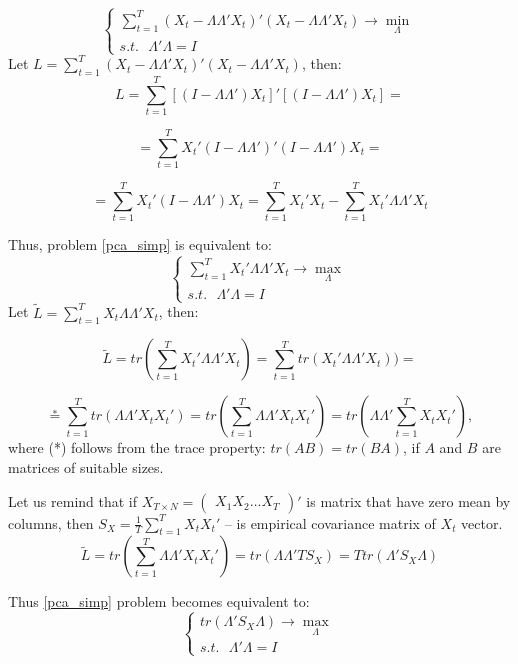 \documentclass[a4paper, 14pt]{article}
\begin{document}
\begin{equation} \label{pca_simp}
\begin{cases}
\sum_{t=1}^{T} (X_t - \Lambda \Lambda'X_t)'(X_t - \Lambda \Lambda'X_t) \rightarrow \min_{\Lambda} \\
s.t. \text{ } \Lambda'\Lambda = I
\end{cases}
\end{equation}
Let $L = \sum_{t=1}^{T} (X_t - \Lambda \Lambda'X_t)'(X_t - \Lambda \Lambda'X_t)$, then:
\[ L=\sum_{t=1}^{T} \left[(I - \Lambda \Lambda') X_t \right] ' \left[(I- \Lambda \Lambda') X_t \right] = 
\]

\[ =\sum_{t=1}^{T} X_t'(I - \Lambda \Lambda')'(I - \Lambda \Lambda') X_t = 
\]

\[
 =\sum_{t=1}^{T} X_t'(I - \Lambda \Lambda') X_t = \sum_{t=1}^{T} X_t' X_t - \sum_{t=1}^{T} X_t' \Lambda \Lambda' X_t	
\]

\noindent Thus, problem \eqref{pca_simp} is equivalent to: 
\begin{equation}
	\begin{cases}
	\sum_{t=1}^{T} X_t' \Lambda \Lambda' X_t \rightarrow \max_{\Lambda} \\
	s.t. \text{ } \Lambda'\Lambda = I
	\end{cases}
\end{equation}
Let $\tilde{L} = \sum_{t=1}^{T} X_t \Lambda \Lambda' X_t$, then:

\[\tilde{L} = tr(\sum_{t=1}^{T} X_t' \Lambda \Lambda' X_t) =  \sum_{t=1}^{T} tr( X_t' \Lambda \Lambda' X_t) ) = \]
 
\[\stackrel{\text{*}}{=} \sum_{t=1}^{T} tr(\Lambda \Lambda' X_t X_t') = 
tr(\sum_{t=1}^T \Lambda \Lambda' X_t X_t') = tr(\Lambda \Lambda' \sum_{t=1}^T  X_t X_t'), \] where (*) follows from the trace property: $tr(AB) = tr(BA)$, if $A$ and $B$ are matrices of suitable sizes.
 
\noindent Let us remind that if $X_{T \times N} = \begin{pmatrix}
X_1 X_2 \dotsc X_T
\end{pmatrix}'$ is matrix that have zero mean by columns, then $S_X = \frac{1}{T} \sum_{t=1}^T  X_t X_t'$ -- is empirical covariance matrix of $X_t$ vector.
\[\tilde{L} = tr(\sum_{t=1}^T \Lambda \Lambda' X_t X_t') = tr(\Lambda \Lambda' T S_X) = T tr(\Lambda' S_X \Lambda)\]

\noindent Thus \eqref{pca_simp} problem becomes equivalent to:
\begin{equation}\label{pca_final}
	\begin{cases}
	tr(\Lambda' S_X \Lambda) \rightarrow \max_{\Lambda} \\
	s.t. \text{ } \Lambda'\Lambda = I
	\end{cases}
\end{equation}
\end{document}
